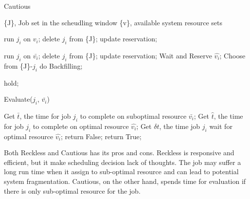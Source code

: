 \documentclass[conference]{IEEEtran}
\begin{document}
\begin{algorithm}
  \label{alg:scheudling2}
  \caption{Cautious}
  \begin{algorithmic}
    \State \{J\}, Job set in the scheudling window
    \State \{v\}, available system resource sets
           
            \State run $j_i$ on $v_i$;
            \State delete $j_i$ from \{J\};
            \State update reservation;
        \EndIf
        
                \State run $j_i$ on $\bar{v_i}$;
                \State delete $j_i$ from \{J\};
                \State update reservation;
            \Else
                \State Wait and Reserve $\hat{v_i}$;
                \State Choose from \{J\}-$j_i$ do Backfilling;
            \EndIf
        \EndIf
        
            \State hold;
        \EndIf
        
    \EndWhile
    
  \end{algorithmic}
\end{algorithm}



\begin{algorithm}
  \label {alg: Evaluate}
  \caption{Evaluate($j_i$, $\bar{v_i}$)}
  \begin{algorithmic}
    \State Get $\bar{t}$, the time for job $j_i$ to complete on suboptimal resource $\bar{v_i}$;
    \State Get $\hat{t}$, the time for job $j_i$ to complete on optimal resource $\hat{v_i}$;
    \State Get $\delta{t}$, the time job $j_i$ wait for optimal resource $\hat{v_i}$;
        \State return False;
    \Else
        \State return True;
    \EndIf
    
  \end{algorithmic}
\end{algorithm}

Both Reckless and Cautious has its pros and cons. Reckless is responsive and efficient, but it make scheduling decision lack of thoughts. The job may suffer a long run time when it assign to sub-optimal resource and can lead to potential system fragmentation. Cautious, on the other hand, spends time for evaluation if there is only sub-optimal resource for the job. 
\end{document}
